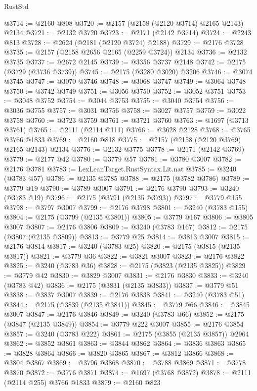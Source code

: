 \begin{lexlean}{RustStd}
\begin{coremodule}
@3714 := @2160 @808
@3720 := @2157 (@2158 (@2120 @3714) @2165 @2143) @2134
@3721 := @2132 @3720
@3723 := @2171 (@2142 @3714)
@3724 := @2243 @813
@3728 := @2624 (@2181 (@2120 @3724) @2188)
@3729 := @2176 @3728
@3735 := @2157 (@2158 @2656 @2165 (@2259 @3724)) @2134
@3736 := @2132 @3735
@3737 := @2672 @2145
@3739 := @3356 @3737 @2148
@3742 := @2175 (@3729 (@3736 @3739))
@3745 := @2175 (@3280 @3020) @3206
@3746 := @3074 @3745
@3747 := @3070 @3746
@3748 := @3068 @3747
@3749 := @3064 @3748
@3750 := @3742 @3749
@3751 := @3056 @3750
@3752 := @3052 @3751
@3753 := @3048 @3752
@3754 := @3044 @3753
@3755 := @3040 @3754
@3756 := @3036 @3755
@3757 := @3031 @3756
@3758 := @3027 @3757
@3759 := @3022 @3758
@3760 := @3723 @3759
@3761 := @3721 @3760
@3763 := @1697 (@3713 @3761)
@3765 := @2111 (@2114 @111)
@3766 := @3628 @2128
@3768 := @3765 @3766 @1833
@3769 := @2160 @818
@3775 := @2157 (@2158 (@2120 @3769) @2165 @2143) @2134
@3776 := @2132 @3775
@3778 := @2171 (@2142 @3769)
@3779 := @2177 @42
@3780 := @3779 @57
@3781 := @3780 @3007
@3782 := @2176 @3781
@3783 := LexLeanTarget.RustSyntax.Lit.nat
@3785 := @3240 (@3783 @57)
@3786 := @2135 @3785
@3788 := @2175 (@3782 @3786)
@3789 := @3779 @19
@3790 := @3789 @3007
@3791 := @2176 @3790
@3793 := @3240 (@3783 @19)
@3796 := @2175 (@3791 (@2135 @3793))
@3797 := @3779 @155
@3798 := @3797 @3007
@3799 := @2176 @3798
@3801 := @3240 (@3783 @155)
@3804 := @2175 (@3799 (@2135 @3801))
@3805 := @3779 @167
@3806 := @3805 @3007
@3807 := @2176 @3806
@3809 := @3240 (@3783 @167)
@3812 := @2175 (@3807 (@2135 @3809))
@3813 := @3779 @25
@3814 := @3813 @3007
@3815 := @2176 @3814
@3817 := @3240 (@3783 @25)
@3820 := @2175 (@3815 (@2135 @3817))
@3821 := @3779 @36
@3822 := @3821 @3007
@3823 := @2176 @3822
@3825 := @3240 (@3783 @36)
@3828 := @2175 (@3823 (@2135 @3825))
@3829 := @3779 @42
@3830 := @3829 @3007
@3831 := @2176 @3830
@3833 := @3240 (@3783 @42)
@3836 := @2175 (@3831 (@2135 @3833))
@3837 := @3779 @51
@3838 := @3837 @3007
@3839 := @2176 @3838
@3841 := @3240 (@3783 @51)
@3844 := @2175 (@3839 (@2135 @3841))
@3845 := @3779 @66
@3846 := @3845 @3007
@3847 := @2176 @3846
@3849 := @3240 (@3783 @66)
@3852 := @2175 (@3847 (@2135 @3849))
@3854 := @3779 @222 @3007
@3855 := @2176 @3854
@3857 := @3240 (@3783 @222)
@3861 := @2175 (@3855 (@2135 @3857)) @2964
@3862 := @3852 @3861
@3863 := @3844 @3862
@3864 := @3836 @3863
@3865 := @3828 @3864
@3866 := @3820 @3865
@3867 := @3812 @3866
@3868 := @3804 @3867
@3869 := @3796 @3868
@3870 := @3788 @3869
@3871 := @3778 @3870
@3872 := @3776 @3871
@3874 := @1697 (@3768 @3872)
@3878 := @2111 (@2114 @255) @3766 @1833
@3879 := @2160 @823

\end{coremodule}
\end{lexlean}
